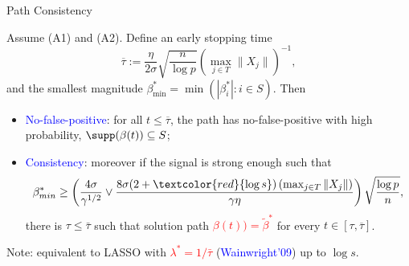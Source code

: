 \documentclass[slidestop,compress,9pt,epsfig,color]{beamer}
\theoremstyle{example}
\begin{document}
\begin{frame}{Path Consistency}
\begin{theorem}[\textcolor{blue}{Osher-Ruan-Xiong-Y.-Yin'2016}]
Assume (A1) and (A2). Define an early stopping time
$$\overline{\tau} := \frac{\eta} {2 \sigma} \sqrt{\frac{n}{\log p}} \left (\max_{j\in T} \|X_j\|\right )^{-1}, $$
and the smallest magnitude $\beta^*_{\min}=\min (|\beta^*_i| : i\in S)$. Then
\begin{itemize}
\item \textcolor{blue}{No-false-positive}: for all $t\leq \overline{\tau}$, the path has no-false-positive with high probability, $\supp(\beta(t))\subseteq S$;
\item \textcolor{blue}{Consistency}: moreover if the signal is strong enough such that
\[\beta^{*}_{min}\geq\left(\frac{4 \sigma}{\gamma^{1/2}} \vee\frac{8\sigma(2+\textcolor{red}{\log{s}})\left (\max_{j\in T} \|X_j\|\right )}{\gamma\eta}\right) \sqrt{\frac{\log{p}}{n}},\]
there is $\tau\leq \bar{\tau}$ such that solution path \textcolor{red}{$\beta(t))=\tilde{\beta}^*$} for every $t\in[\tau, \overline{\tau}]$.
\end{itemize}
\end{theorem}
Note: equivalent to LASSO with \textcolor{red}{$\lambda^*=1/\bar{\tau}$} (\textcolor{blue}{Wainwright'09}) up to $\log s$.
\end{frame}


\end{document}
